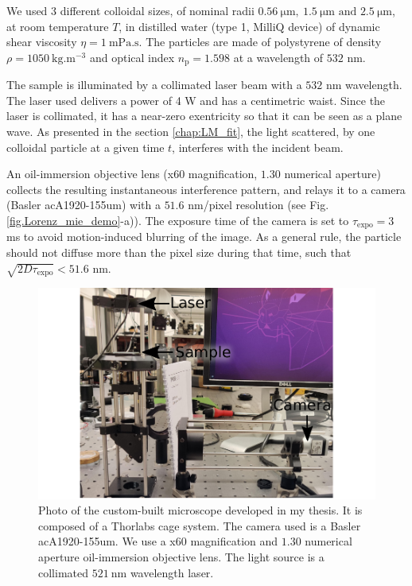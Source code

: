 We used 3 different colloidal sizes, of nominal radii $0.56 ~ \mathrm{\mu m}, ~ 1.5 ~ \mathrm{\mu m} \text{ and } 2.5 ~ \mathrm{\mu m} $, at room temperature $T$, in distilled water (type 1, MilliQ device) of dynamic shear viscosity $\eta = 1 ~ \mathrm{mPa.s}$. The particles are made of polystyrene of density $\rho = 1050  ~\mathrm{kg.m^{-3}}$ and optical index $n_\mathrm{p} = 1.598$ at a wavelength of $532$ nm.

The sample is illuminated by a collimated laser beam with a $532$ nm wavelength. The laser used delivers a power of 4 W and has a centimetric waist. Since the laser is collimated, it has a near-zero exentricity so that it can be seen as a plane wave. As presented in the section \ref{chap:LM_fit}, the light scattered, by one colloidal particle at a given time $t$, interferes with the incident beam. 

An oil-immersion objective lens (x60 magnification, $1.30$ numerical aperture) collects the resulting instantaneous interference pattern, and relays it to a camera (Basler acA1920-155um) with a $51.6$ nm/pixel resolution (see Fig.\ref{fig.Lorenz_mie_demo}-a)). The exposure time of the camera is set to $\tau_{\mathrm{expo}} = 3$ ms to avoid motion-induced blurring of the image. As a general rule, the particle should not diffuse more than the pixel size during that time, such that $\sqrt{2D\tau_{\mathrm{expo}} }< 51.6$ nm.

\begin{figure}[!ht]
	\centering
	\includegraphics{02_body/chapter2/images/figures_setup/photo_setup.pdf}
	\caption{Photo of the custom-built microscope developed in my thesis. It is composed of a Thorlabs cage system. The camera used is a Basler acA1920-155um. We use a x60 magnification and $1.30$ numerical aperture oil-immersion objective lens. The light source is a collimated  $521 ~ \mathrm{n m}$ wavelength laser.}
	\label{fig:picture}
\end{figure}


